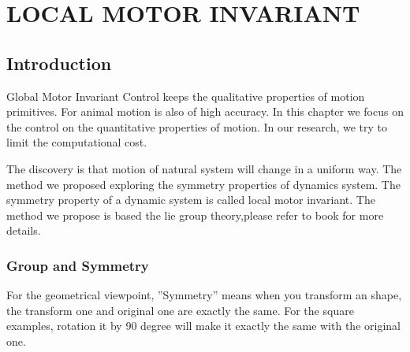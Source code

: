\chapter{LOCAL MOTOR INVARIANT}
\label{chap:li}

\ifpdf
    \graphicspath{{LocalInvariant/LocalInvariantFigs/PNG/}{LocalInvariant/LocalInvariantFigs/PDF/}{LocalInvariant/LocalInvariantFigs/}}
\else
    \graphicspath{{LocalInvariant/LocalInvariantFigs/EPS/}{LocalInvariant/LocalInvariantFigs/}}
\fi

\section{Introduction}
Global Motor Invariant Control keeps the qualitative properties of motion primitives.
For animal motion is also of high accuracy.
In this chapter we focus on the control on the quantitative properties of motion.
In our research, we try to limit the computational cost.


The discovery is that motion of natural system will change in a uniform way.
The method we proposed exploring the symmetry properties of dynamics system.
The symmetry property of a dynamic system is called local motor invariant.
The method we propose is based the lie group theory,please refer to book\citep{olver1986applications}
for more details.

\subsection{Group and Symmetry}
For the geometrical viewpoint, ''Symmetry''  means when you transform an shape, the transform one and original one are exactly the same.
For the square examples, rotation it by 90 degree will make it exactly the same with the original one.



